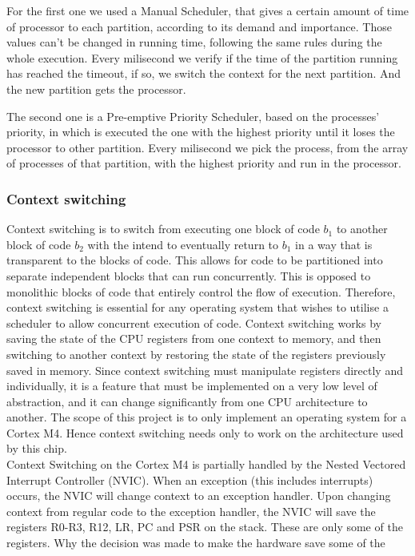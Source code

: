 For the first one we used a Manual Scheduler, that gives a certain amount of time of processor to each partition, according to its demand and importance. Those values can't be changed in running time, following the same rules during the whole execution. Every milisecond we verify if the time of the partition running has reached the timeout, if so, we switch the context for the next partition. And the new partition gets the processor.

The second one is a Pre-emptive Priority Scheduler, based on the processes' priority, in which is executed the one with the highest priority until it loses the processor to other partition. Every milisecond we pick the process, from the array of processes of that partition, with the highest priority and run in the processor.

\subsubsection{Context switching}
Context switching is to switch from executing one block of code $b_1$ to another block of code $b_2$
with the intend to eventually return to $b_1$ in a way that is transparent to the blocks of code.
This allows for code to be partitioned into separate independent blocks that can run concurrently.
This is opposed to monolithic blocks of code that entirely control the flow of execution.
Therefore, context switching is essential for any operating system that wishes to utilise a scheduler to allow concurrent execution of code.
Context switching works by saving the state of the CPU registers from one context to memory,
and then switching to another context by restoring the state of the registers previously saved in memory.
Since context switching must manipulate registers directly and individually, it is a feature that must be implemented
on a very low level of abstraction, and it can change significantly from one CPU architecture to another.
The scope of this project is to only implement an operating system for a Cortex M4. Hence context switching needs only
to work on the architecture used by this chip.\\
Context Switching on the Cortex M4 is partially handled by the Nested Vectored Interrupt Controller (NVIC).
When an exception (this includes interrupts) occurs, the NVIC will change context to an exception handler.
Upon changing context from regular code to the exception handler, the NVIC will save the registers R0-R3, R12, LR, PC and PSR
on the stack. These are only some of the registers. Why the decision was made to make the hardware save some of the
